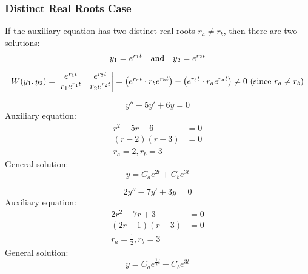 \documentclass[12pt]{article}
\begin{document}
\subsubsection{Distinct Real Roots Case}
\label{sssec:distinctRealRootsCase}

If the auxiliary equation has two distinct real roots $r_a \neq r_b$, then there are two solutions:
\begin{equation*}
  y_1 = e^{r_1t}\ \ \ \textup{and}\ \ \ y_2 = e^{r_2t}
\end{equation*}

\begin{equation*}
  W(y_1,y_2) = 
  \begin{vmatrix}
    e^{r_1t} & e^{r_2t} \\
    r_1e^{r_1t} & r_2e^{r_2t} \\
  \end{vmatrix} = 
  \left( e^{r_at} \cdot r_be^{r_bt} \right) - \left( e^{r_bt} \cdot r_ae^{r_at} \right) \neq 0\ (\textup{since $r_a \neq r_b$})
\end{equation*}

\begin{example}
  \begin{equation*}
    y'' - 5y' + 6y = 0
  \end{equation*}
  Auxiliary equation:
  \begin{align*}
    r^2 - 5r + 6 &= 0 \\
    (r-2)(r-3) &= 0 \\
    r_a = 2, r_b = 3
  \end{align*}
  General solution:
  \begin{equation*}
    y = C_ae^{2t} + C_be^{3t}
  \end{equation*}
\end{example}

\begin{example}
  \begin{equation*}
    2y'' - 7y' + 3y = 0
  \end{equation*}
  Auxiliary equation:
  \begin{align*}
    2r^2 - 7r + 3 &= 0 \\
    (2r-1)(r-3) &= 0 \\
    r_a = \frac{1}{2}, r_b = 3
  \end{align*}
  General solution:
  \begin{equation*}
    y = C_ae^{\frac{1}{2}t} + C_be^{3t}
  \end{equation*}
\end{example}
\end{document}
